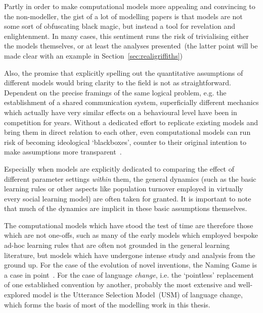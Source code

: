 Partly in order to make computational models more appealing and convincing to the non-modeller, the gist of a lot of modelling papers is that models are not some sort of obfuscating black magic, but instead a tool for revelation and enlightenment.
In many cases, this sentiment runs the risk of trivialising either the models themselves, or at least the analyses presented~(the latter point will be made clear with an example in Section~\ref{sec:realigriffiths})


Also, the promise that explicitly spelling out the quantitative assumptions of different models would bring clarity to the field is not as straightforward. Dependent on the precise framings of the same logical problem, e.g. the establishment of a shared communication system, superficially different mechanics which actually have very similar effects on a behavioural level have been in competition for years. Without a dedicated effort to replicate existing models and bring them in direct relation to each other, even computational models can run risk of becoming ideological `blackboxes', counter to their original intention to make assumptions more transparent~\citep[see][for the exemplary case of proposed pressures]{Spike2016}.


Especially when models are explicitly dedicated to comparing the effect of different parameter settings \emph{within} them, the general dynamics (such as the basic learning rules or other aspects like population turnover employed in virtually every social learning model) are often taken for granted. It is important to note that much of the dynamics are implicit in these basic assumptions themselves. 

The computational models which have stood the test of time are therefore those which are not one-offs, such as many of the early models which employed bespoke ad-hoc learning rules that are often not grounded in the general learning literature, but models which have undergone intense study and analysis from the ground up. For the case of the evolution of novel inventions, the Naming Game is a case in point~\citep{Baronchelli2008}. For the case of language \emph{change}, i.e. the `pointless' replacement of one established convention by another, probably the most extensive and well-explored model is the Utterance Selection Model~(USM) of language change, which forms the basis of most of the modelling work in this thesis.


